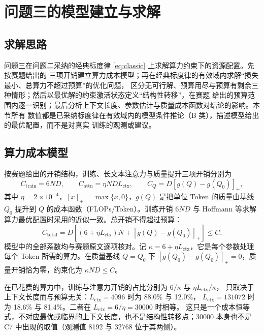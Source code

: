 \section{问题三的模型建立与求解}
\label{sec:q3}

\subsection{求解思路}

问题三在问题二采纳的经典标度律 \eqref{eq:classic} 上求解算力约束下的资源配置。先按赛题给出的
三项开销建立算力成本模型；再在经典标度律的有效域内求解“损失最小、总算力不超过预算”的优化问题，
区分无可行解、预算用尽与预算有剩余三种情形；然后以最优解的约束激活状态定义“结构性转移”，在赛题
给出的预算范围内逐一识别；最后分析上下文长度、参数估计与质量成本函数对结论的影响。本节所有
数值都是已采纳标度律在有效域内的模型条件推论（B 类），描述模型给出的最优配置，而不是对真实
训练的观测或建议。

\subsection{算力成本模型}

按赛题给出的开销结构，训练、长文本注意力与质量提升三项开销分别为
\begin{equation}
  C_{\mathrm{train}}=6ND,\qquad
  C_{\mathrm{attn}}=\eta N D L_{\mathrm{ctx}},\qquad
  C_{Q}=D\left[g(Q)-g(Q_0)\right]_{+},
  \label{eq:q3-costs}
\end{equation}
其中 $\eta=2\times10^{-4}$，$[x]_{+}=\max\{x,0\}$，$g(Q)$ 是把单位 Token 的质量由基线 $Q_0$ 提升到
$Q$ 的成本函数（FLOPs/Token）。训练开销 $6ND$ 与 Hoffmann 等\cite{hoffmann2022chinchilla}求解
算力最优配置时采用的近似一致。总开销不得超过预算：
\begin{equation}
  C_{\mathrm{total}}=D\left[(6+\eta L_{\mathrm{ctx}})N+\left[g(Q)-g(Q_0)\right]_{+}\right]\le C .
  \label{eq:q3-budget}
\end{equation}
模型中的全部系数均与赛题原文逐项核对。记 $\kappa=6+\eta L_{\mathrm{ctx}}$，它是每个参数处理
每个 Token 所需的算力。在质量基线 $Q=Q_0$ 下 $[g(Q_0)-g(Q_0)]_{+}=0$，质量开销恰为零，约束化为
$\kappa ND\le C$。

在已花费的算力中，训练与注意力开销的占比分别为 $6/\kappa$ 与 $\eta L_{\mathrm{ctx}}/\kappa$，
只取决于上下文长度而与预算无关：$L_{\mathrm{ctx}}=4096$ 时为 88.0\% 与 12.0\%，
$L_{\mathrm{ctx}}=131072$ 时为 18.6\% 与 81.4\%。二者在 $L_{\mathrm{ctx}}=6/\eta=30000$ 时相等。
这只是一个成本恒等式，不对应最优或临界的上下文长度，也不是结构性转移点；30000 本身也不是
C7 中出现的取值（观测值 8192 与 32768 位于其两侧）。

